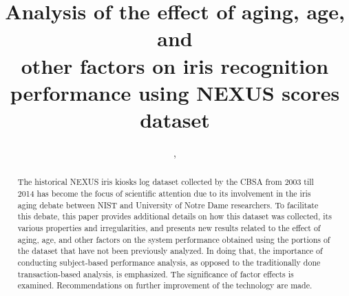 \documentclass{cta-author}%
\newcommand{\cmt}[1]{}
\begin{document}


\title{Analysis of
the effect of aging, age, and \\other factors on iris recognition performance 
using  NEXUS scores dataset 
}


\author{,   }

\address{%
}




\begin{abstract}
The historical NEXUS iris kiosks log dataset collected by the CBSA  from 2003 till 2014
has become the focus of scientific attention   due  to its involvement in the iris aging debate between  NIST and University of Notre Dame researchers. %
To facilitate this debate, this paper provides additional details on how this dataset was collected, its various properties and irregularities, and presents new results related to the effect of  aging, age, and other factors on the system performance
obtained using the portions of the dataset that have not been previously analyzed.
In doing that, the importance of conducting subject-based performance analysis, as opposed to the traditionally done transaction-based analysis, is emphasized. 
The significance of factor effects is examined.  
Recommendations on further improvement of the technology are made.

\cmt{
The effect of aging is shown to be smaller than that of other factors.
Aging is shown to be the least significant, while age the most significant.
At the same time, it is found that iris biometrics performs worse for certain age groups.
The effect of age, not aging, is found to be the most significant.
The variation of technology performance by age is uncovered.
The existence of demographic bias in iris biometrics is uncovered - older and young travellers are shown to be disadvantaged by the technology.
The existence of demographic bias in iris biometrics, i.e., it performs worse for certain age groups, is uncovered.
as the technology is found to perform worse for younger and older travellers.
The effect of aging is found  negligible, while the effect of age the most significant, 
making older and young travellers  disadvantaged by the technology.
}

\end{abstract}
\end{document}
